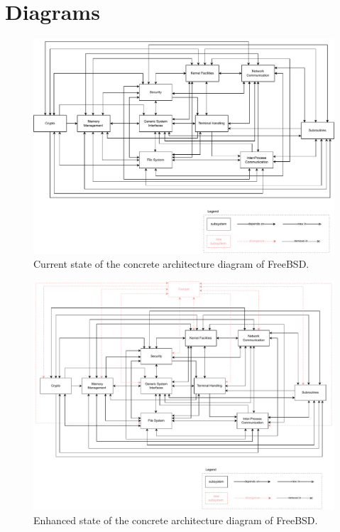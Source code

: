\documentclass[12pt, dvipsnames, a4paper]{article}
\begin{document}
\section{Diagrams}
\begin{figure}[!htb]
	\center
	\includegraphics[width = 500pt]{assets/architecture_diagrams/current-concrete-architecture.pdf}
	\caption{Current state of the concrete architecture diagram of FreeBSD.}
\end{figure}
\begin{figure}[!htb]
	\center
	\includegraphics[width = 500pt]{assets/architecture_diagrams/enhanced-concrete-architecture.pdf}
	\caption{Enhanced state of the concrete architecture diagram of FreeBSD.}
\end{figure}
\clearpage
\end{document}
